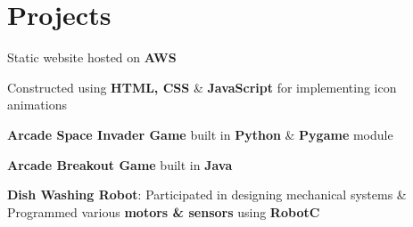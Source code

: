 \documentclass[]{morris-cv}
\begin{document}
\begin{minipage}[t]{0.67\textwidth}

\section{Projects}
\descript{}
\location{}
\begin{tightemize}
    \item Static website hosted on \textbf{AWS}
    \item Constructed using \textbf{HTML, CSS} \& \textbf{JavaScript} for implementing icon animations
\end{tightemize}
\sectionsep

\descript{}
\location{}
\begin{tightemize}
    \item \textbf{Arcade Space Invader Game} built in \textbf{Python} \& \textbf{Pygame} module
    \item \textbf{Arcade Breakout Game} built in \textbf{Java}
    \item \textbf {Dish Washing Robot}: Participated in designing mechanical systems \& Programmed various  \textbf{motors \& sensors} using \textbf{RobotC}
\end{tightemize}
\sectionsep




\end{minipage}
\end{document}
